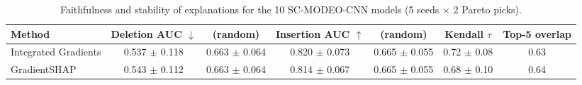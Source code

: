 \begin{table}[t]
\centering
\caption{Faithfulness and stability of explanations for the 10 SC-MODEO-CNN models (5 seeds $\times$ 2 Pareto picks).}
\label{tab:xai}
\footnotesize
\begin{tabular}{lcccccc}
\toprule
Method & Deletion AUC $\downarrow$ & (random) & Insertion AUC $\uparrow$ & (random) & Kendall $\tau$ & Top-5 overlap \\
\midrule
Integrated Gradients & 0.537 $\pm$ 0.118 & 0.663 $\pm$ 0.064 & 0.820 $\pm$ 0.073 & 0.665 $\pm$ 0.055 & 0.72 $\pm$ 0.08 & 0.63 \\
GradientSHAP & 0.543 $\pm$ 0.112 & 0.663 $\pm$ 0.064 & 0.814 $\pm$ 0.067 & 0.665 $\pm$ 0.055 & 0.68 $\pm$ 0.10 & 0.64 \\
\bottomrule
\end{tabular}
\end{table}
